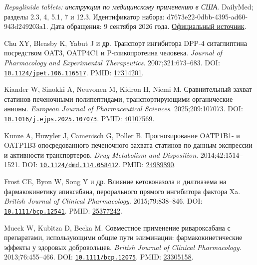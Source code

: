 \documentclass[11pt]{article}
\begin{document}
\begin{description}[before={\microtypesetup{expansion=false}\setlength{\RaggedRightRightskip}{0pt plus 4em}\RaggedRight}]
\item[{[56]}] \textit{Repaglinide tablets: инструкция по медицинскому применению в США}. DailyMed; разделы 2.3, 4, 5.1, 7 и 12.3. Идентификатор набора: d7673e22-0dbb-4395-ad60-943d249203a1. Дата обращения: 9 сентября 2026 года. \href{https://dailymed.nlm.nih.gov/dailymed/drugInfo.cfm?setid=d7673e22-0dbb-4395-ad60-943d249203a1}{Официальный источник}.
\item[{[57]}] Chu XY, Bleasby K, Yabut J и др. Транспорт ингибитора DPP-4 ситаглиптина посредством OAT3, OATP4C1 и P-гликопротеина человека. \textit{\foreignlanguage{english}{Journal of Pharmacology and Experimental Therapeutics}}. 2007;321:673--683. DOI: \href{https://doi.org/10.1124/jpet.106.116517}{\nolinkurl{10.1124/jpet.106.116517}}. PMID: \href{https://pubmed.ncbi.nlm.nih.gov/17314201/}{17314201}.
\item[{[58]}] Kiander W, Sinokki A, Neuvonen M, Kidron H, Niemi M. Сравнительный захват статинов печеночными полипептидами, транспортирующими органические анионы. \textit{\foreignlanguage{english}{European Journal of Pharmaceutical Sciences}}. 2025;209:107073. DOI: \href{https://doi.org/10.1016/j.ejps.2025.107073}{\nolinkurl{10.1016/j.ejps.2025.107073}}. PMID: \href{https://pubmed.ncbi.nlm.nih.gov/40107569/}{40107569}.
\item[{[59]}] Kunze A, Huwyler J, Camenisch G, Poller B. Прогнозирование OATP1B1- и OATP1B3-опосредованного печеночного захвата статинов по данным экспрессии и активности транспортеров. \textit{\foreignlanguage{english}{Drug Metabolism and Disposition}}. 2014;42:1514--1521. DOI: \href{https://doi.org/10.1124/dmd.114.058412}{\nolinkurl{10.1124/dmd.114.058412}}. PMID: \href{https://pubmed.ncbi.nlm.nih.gov/24989890/}{24989890}.
\item[{[60]}] Frost CE, Byon W, Song Y и др. Влияние кетоконазола и дилтиазема на фармакокинетику апиксабана, перорального прямого ингибитора фактора Xa. \textit{\foreignlanguage{english}{British Journal of Clinical Pharmacology}}. 2015;79:838--846. DOI: \href{https://doi.org/10.1111/bcp.12541}{\nolinkurl{10.1111/bcp.12541}}. PMID: \href{https://pubmed.ncbi.nlm.nih.gov/25377242/}{25377242}.
\item[{[61]}] Mueck W, Kubitza D, Becka M. Совместное применение ривароксабана с препаратами, использующими общие пути элиминации: фармакокинетические эффекты у здоровых добровольцев. \textit{\foreignlanguage{english}{British Journal of Clinical Pharmacology}}. 2013;76:455--466. DOI: \href{https://doi.org/10.1111/bcp.12075}{\nolinkurl{10.1111/bcp.12075}}. PMID: \href{https://pubmed.ncbi.nlm.nih.gov/23305158/}{23305158}.

\end{description}
\end{document}
